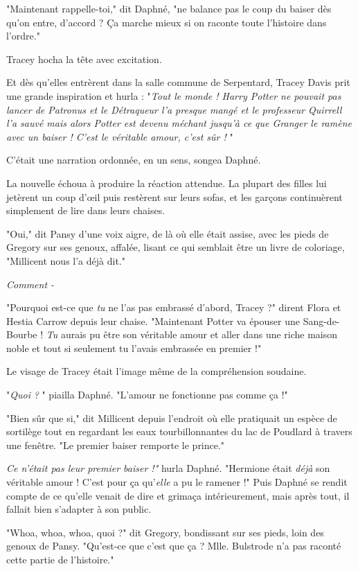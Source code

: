"Maintenant rappelle-toi," dit Daphné, "ne balance pas le coup du baiser dès qu'on entre, d'accord ? Ça marche mieux si on raconte toute l'histoire dans l'ordre."

Tracey hocha la tête avec excitation.

Et dès qu'elles entrèrent dans la salle commune de Serpentard, Tracey Davis prit une grande inspiration et hurla : "\emph{Tout le monde ! Harry Potter ne pouvait pas lancer de Patronus et le Détraqueur l'a presque mangé et le professeur Quirrell l'a sauvé mais alors Potter est devenu méchant jusqu'à ce que Granger le ramène avec un baiser ! C'est le véritable amour, c'est sûr !} "

C'était une narration ordonnée, en un sens, songea Daphné.

La nouvelle échoua à produire la réaction attendue. La plupart des filles lui jetèrent un coup d'œil puis restèrent sur leurs sofas, et les garçons continuèrent simplement de lire dans leurs chaises.

"Oui," dit Pansy d'une voix aigre, de là où elle était assise, avec les pieds de Gregory sur ses genoux, affalée, lisant ce qui semblait être un livre de coloriage, "Millicent nous l'a déjà dit."

\emph{Comment -} 

"Pourquoi est-ce que \emph{tu}  ne l'as pas embrassé d'abord, Tracey ?" dirent Flora et Hestia Carrow depuis leur chaise. "Maintenant Potter va épouser une Sang-de-Bourbe ! \emph{Tu}  aurais pu être son véritable amour et aller dans une riche maison noble et tout si seulement tu l'avais embrassée en premier !"

Le visage de Tracey était l'image même de la compréhension soudaine.

"\emph{Quoi}  \emph{?} " piailla Daphné. "L'amour ne fonctionne pas comme ça !"

"Bien sûr que si," dit Millicent depuis l'endroit où elle pratiquait un espèce de sortilège tout en regardant les eaux tourbillonnantes du lac de Poudlard à travers une fenêtre. "Le premier baiser remporte le prince."

\emph{Ce n'était pas leur premier baiser !"}  hurla Daphné. "Hermione était \emph{déjà}  son véritable amour ! C'est pour ça qu'\emph{elle}  a pu le ramener !" Puis Daphné se rendit compte de ce qu'elle venait de dire et grimaça intérieurement, mais après tout, il fallait bien s'adapter à son public.

"Whoa, whoa, whoa, quoi ?" dit Gregory, bondissant sur ses pieds, loin des genoux de Pansy. "Qu'est-ce que c'est que ça ? Mlle. Bulstrode n'a pas raconté cette partie de l'histoire."


